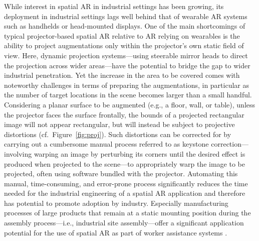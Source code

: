 \documentclass[review]{elsarticle}
\begin{document}
While interest in spatial AR in industrial settings has been growing, its deployment in industrial settings lags well behind that of wearable AR systems such as handhelds or head-mounted displays. One of the main shortcomings of typical projector-based spatial AR relative to AR relying on wearables is the ability to project augmentations only within the projector's own static field of view. Here, dynamic projection systems---using steerable mirror heads to direct the projection across wider areas---have the potential to bridge the gap to wider industrial penetration. Yet the increase in the area to be covered comes with noteworthy challenges in terms of preparing the augmentations, in particular as the number of target locations in the scene becomes larger than a small handful. Considering a planar surface to be augmented (e.g., a floor, wall, or table), unless the projector faces the surface frontally, the bounds of a projected rectangular image will not appear rectangular, but will instead be subject to projective distortions (cf.\ Figure~\ref{fig:proj}). Such distortions can be corrected for by carrying out a cumbersome manual process referred to as keystone correction---involving warping an image by perturbing its corners until the desired effect is produced when projected to the scene---to appropriately warp the image to be projected, often using software bundled with the projector. Automating this manual, time-consuming, and error-prone process significantly reduces the time needed for the industrial engineering of a spatial AR application and therefore has potential to promote adoption by industry. Especially manufacturing processes of large products that remain at a static mounting position during the assembly process---i.e., industrial site assembly---offer a significant application potential for the use of spatial AR as part of worker assistance systems \cite{mayrhofer2019one}.
\end{document}
